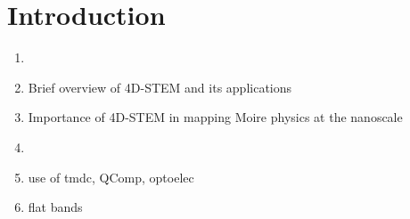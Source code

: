 \section{Introduction}
\begin{enumerate}

\item 
    \item Brief overview of 4D-STEM and its applications
    \item Importance of 4D-STEM in mapping Moire physics at the nanoscale
    \item 
    \item use of tmdc, QComp, optoelec
    \item flat bands
\end{enumerate}
